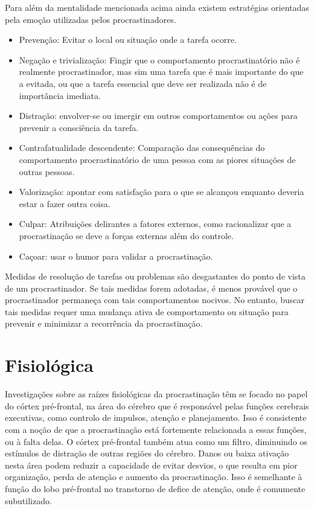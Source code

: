 \documentclass{report}
\begin{document}
\vspace{10mm}

Para além da mentalidade mencionada acima ainda existem estratégias orientadas pela emoção utilizadas pelos procrastinadores.
\begin{itemize}
    \item Prevenção: Evitar o local ou situação onde a tarefa ocorre.
    \item Negação e trivialização: Fingir que o comportamento procrastinatório não é realmente procrastinador, mas sim uma tarefa que é mais importante do que a evitada, ou que a tarefa essencial que deve ser realizada não é de importância imediata.
    \item Distração: envolver-se ou imergir em outros comportamentos ou ações para prevenir a consciência da tarefa.
    \item Contrafatualidade descendente: Comparação das consequências do comportamento procrastinatório de uma pessoa com as piores situações de outras pessoas.
    \item Valorização: apontar com satisfação para o que se alcançou enquanto deveria estar a fazer outra coisa.
    \item Culpar: Atribuições delirantes a fatores externos, como racionalizar que a procrastinação se deve a forças externas além do controle.
    \item Caçoar: usar o humor para validar a procrastinação.
\end{itemize}

Medidas de resolução de tarefas ou problemas são desgastantes do ponto de vista de um procrastinador. Se tais medidas forem adotadas, é menos provável que o procrastinador permaneça com tais comportamentos nocivos. No entanto, buscar tais medidas requer uma mudança ativa de comportamento ou situação para prevenir e minimizar a recorrência da procrastinação.



\section{Fisiológica}
\label{chap.fisiológica}

Investigações sobre as raízes fisiológicas da procrastinação têm se focado no papel do córtex pré-frontal, na área do cérebro que é responsável pelas funções cerebrais executivas, como controlo de impulsos, atenção e planejamento. Isso é consistente com a noção de que a procrastinação está fortemente relacionada a essas funções, ou à falta delas. O córtex pré-frontal também atua como um filtro, diminuindo os estímulos de distração de outras regiões do cérebro. Danos ou baixa ativação nesta área podem reduzir a capacidade de evitar desvios, o que resulta em pior organização, perda de atenção e aumento da procrastinação. Isso é semelhante à função do lobo pré-frontal no transtorno de defice de atenção, onde é comumente subutilizado. 
\end{document}
